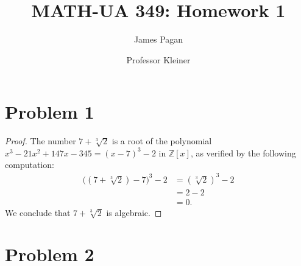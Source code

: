 \documentclass[11pt]{article}
\title{MATH-UA 349: Homework 1}
\author{James Pagan}
\date{Professor Kleiner}
\begin{document}
\maketitle
\tableofcontents
\newpage


\section{Problem 1}

\begin{proof}
  The number $7 + \sqrt[3]{2}$ is a root of the polynomial $x^{3} - 21x^{2} + 147x - 345 = (x - 7)^{3} - 2$ in $\mathbb{Z}[x]$, as verified by the following computation:
  \begin{align*}
	  \big( (7 + \sqrt[3]{2}) - 7 \big)^{3} - 2 &= (\sqrt[3]{2})^{3} - 2 \\
  	&= 2 - 2 \\
  	&= 0.
  \end{align*}
  We conclude that $7 + \sqrt[3]{2}$ is algebraic.
\end{proof} 


\section{Problem 2}
\end{document}
